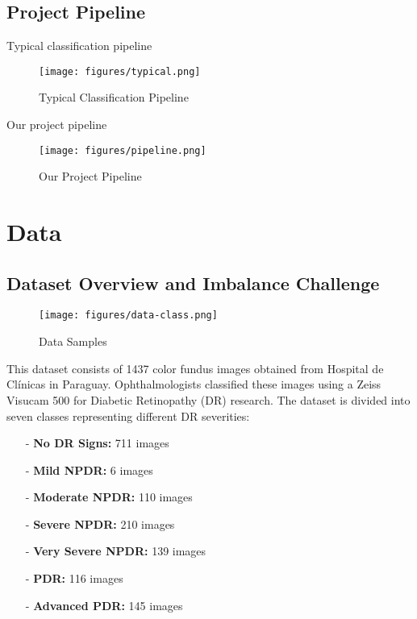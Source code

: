 \documentclass[conference]{IEEEtran}
\begin{document}
\subsection{Project Pipeline}

Typical classification pipeline
\begin{figure}[h]
\centering
\texttt{[image: figures/typical.png]}
\caption{Typical Classification Pipeline}
\label{fig:typical_pipeline}
\end{figure}

Our project pipeline
\begin{figure}[h]
\centering
\texttt{[image: figures/pipeline.png]}
\caption{Our Project Pipeline}
\label{fig:project_pipeline}
\end{figure}

\section{\textbf{Data}}

\subsection{Dataset Overview and Imbalance Challenge}

\begin{figure}[h]
\centering
\texttt{[image: figures/data-class.png]}
\caption{Data Samples}
\label{fig:data-class}
\end{figure}

This dataset consists of 1437 color fundus images obtained from Hospital de Clínicas in Paraguay. Ophthalmologists classified these images using a Zeiss Visucam 500 for Diabetic Retinopathy (DR) research. The dataset is divided into seven classes representing different DR severities:\\

\begin{itemize}
    \item[-] \textbf{No DR Signs:} 711 images
    \item[-] \textbf{Mild NPDR:} 6 images
    \item[-] \textbf{Moderate NPDR:} 110 images
    \item[-] \textbf{Severe NPDR:} 210 images
    \item[-] \textbf{Very Severe NPDR:} 139 images
    \item[-] \textbf{PDR:} 116 images
    \item[-] \textbf{Advanced PDR:} 145 images\\
\end{itemize}{}
\end{document}
